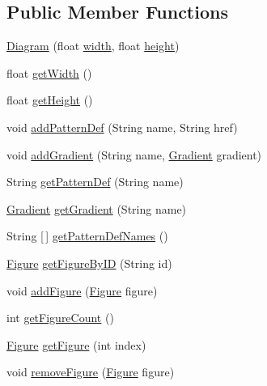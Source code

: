 \subsection*{Public Member Functions}
\begin{DoxyCompactItemize}
\item 
\mbox{\hyperlink{classorg_1_1newdawn_1_1slick_1_1svg_1_1_diagram_a195b124503d16a62bdb6a36dfb8effee}{Diagram}} (float \mbox{\hyperlink{classorg_1_1newdawn_1_1slick_1_1svg_1_1_diagram_aa2e5e9291614fb66fef4f8d0672a9da6}{width}}, float \mbox{\hyperlink{classorg_1_1newdawn_1_1slick_1_1svg_1_1_diagram_a5b6d7878e986b788521bb72fb0168518}{height}})
\item 
float \mbox{\hyperlink{classorg_1_1newdawn_1_1slick_1_1svg_1_1_diagram_ac7ae4b74889a46b9f8cec1aa73de4b44}{get\+Width}} ()
\item 
float \mbox{\hyperlink{classorg_1_1newdawn_1_1slick_1_1svg_1_1_diagram_ac5e6c5d35ccfdb09d256ae3118210eb8}{get\+Height}} ()
\item 
void \mbox{\hyperlink{classorg_1_1newdawn_1_1slick_1_1svg_1_1_diagram_a5c40fa781bb601e7d5590d81dd441661}{add\+Pattern\+Def}} (String name, String href)
\item 
void \mbox{\hyperlink{classorg_1_1newdawn_1_1slick_1_1svg_1_1_diagram_a53cfd1607b66ba8cf8ebc6d2417f7b41}{add\+Gradient}} (String name, \mbox{\hyperlink{classorg_1_1newdawn_1_1slick_1_1svg_1_1_gradient}{Gradient}} gradient)
\item 
String \mbox{\hyperlink{classorg_1_1newdawn_1_1slick_1_1svg_1_1_diagram_a42164eb0201d4ab2b3d58ee7fd5aad26}{get\+Pattern\+Def}} (String name)
\item 
\mbox{\hyperlink{classorg_1_1newdawn_1_1slick_1_1svg_1_1_gradient}{Gradient}} \mbox{\hyperlink{classorg_1_1newdawn_1_1slick_1_1svg_1_1_diagram_a13c8069cc4608b5f12fdab9586793d64}{get\+Gradient}} (String name)
\item 
String \mbox{[}$\,$\mbox{]} \mbox{\hyperlink{classorg_1_1newdawn_1_1slick_1_1svg_1_1_diagram_a1e03fcbc57b25710101ef5aea4d43af1}{get\+Pattern\+Def\+Names}} ()
\item 
\mbox{\hyperlink{classorg_1_1newdawn_1_1slick_1_1svg_1_1_figure}{Figure}} \mbox{\hyperlink{classorg_1_1newdawn_1_1slick_1_1svg_1_1_diagram_a48e5139af7e00cb48fcffcc5dea19106}{get\+Figure\+By\+ID}} (String id)
\item 
void \mbox{\hyperlink{classorg_1_1newdawn_1_1slick_1_1svg_1_1_diagram_a3236e5149ac3b950921c1c0fe27ad8ad}{add\+Figure}} (\mbox{\hyperlink{classorg_1_1newdawn_1_1slick_1_1svg_1_1_figure}{Figure}} figure)
\item 
int \mbox{\hyperlink{classorg_1_1newdawn_1_1slick_1_1svg_1_1_diagram_a869127d837d1ffa281dc3e50817ae22e}{get\+Figure\+Count}} ()
\item 
\mbox{\hyperlink{classorg_1_1newdawn_1_1slick_1_1svg_1_1_figure}{Figure}} \mbox{\hyperlink{classorg_1_1newdawn_1_1slick_1_1svg_1_1_diagram_aa331087982df2abf665a0b8bb7787118}{get\+Figure}} (int index)
\item 
void \mbox{\hyperlink{classorg_1_1newdawn_1_1slick_1_1svg_1_1_diagram_a2252efc0fab27de7c268b0efb114c073}{remove\+Figure}} (\mbox{\hyperlink{classorg_1_1newdawn_1_1slick_1_1svg_1_1_figure}{Figure}} figure)
\end{DoxyCompactItemize}
